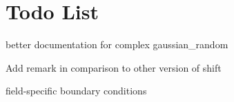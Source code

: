 \chapter{Todo List}
\hypertarget{todo}{}\label{todo}

\begin{DoxyRefList}
\item[Member \doxylink{classComplex_adc9a81d7f2b659e644ad94f49d656ad5}{Complex\texorpdfstring{$<$}{<} T \texorpdfstring{$>$}{>}\+::gaussian\+\_\+random} (double width=1.\+0) out\+\_\+only]\label{todo__todo000001}%
%
better documentation for complex gaussian\+\_\+random  
\item[Member \doxylink{classField_a8a40a58d44e5b87e4189bf3242b79a32}{Field\texorpdfstring{$<$}{<} T \texorpdfstring{$>$}{>}\+::shift} (const Coordinate\+Vector \&v, Parity par) const]\label{todo__todo000003}%
%
Add remark in comparison to other version of shift  
\item[Class \doxylink{classfield__struct}{field\+\_\+struct\texorpdfstring{$<$}{<} T \texorpdfstring{$>$}{>}} ]\label{todo__todo000002}%
%
field-\/specific boundary conditions 
\end{DoxyRefList}